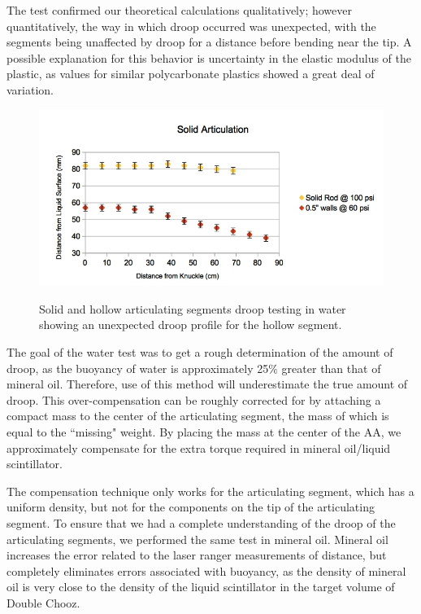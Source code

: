 The test confirmed our theoretical calculations qualitatively; however quantitatively, the way in which droop occurred was unexpected, with the segments being unaffected by droop for a distance before bending near the tip. A possible explanation for this behavior is uncertainty in the elastic modulus of the plastic, as values for similar polycarbonate plastics showed a great deal of variation.  

\begin{figure}
\caption{Solid and hollow articulating segments droop testing in water showing an unexpected droop profile for the hollow segment.}
\includegraphics[width=\textwidth]{AA/Solid_Hollow.jpg}
\label{Solid_v_Hollow}
\end{figure}

The goal of the water test was to get a rough determination of the amount of droop, as the buoyancy of water is approximately 25$\%$ greater than that of mineral oil. Therefore, use of this method will underestimate the true amount of droop. This over-compensation can be roughly corrected for by attaching a compact mass to the center of the articulating segment, the mass of which is equal to the ``missing" weight. By placing the mass at the center of the AA, we approximately compensate for the extra torque required in mineral oil/liquid scintillator. 

The compensation technique only works for the articulating segment, which has a uniform density, but not for the components on the tip of the articulating segment. To ensure that we had a complete understanding of the droop of the articulating segments, we performed the same test in mineral oil.  Mineral oil increases the error related to the laser ranger measurements of distance, but completely eliminates errors associated with buoyancy, as the density of mineral oil is very close to the density of the liquid scintillator in the target volume of Double Chooz. 

